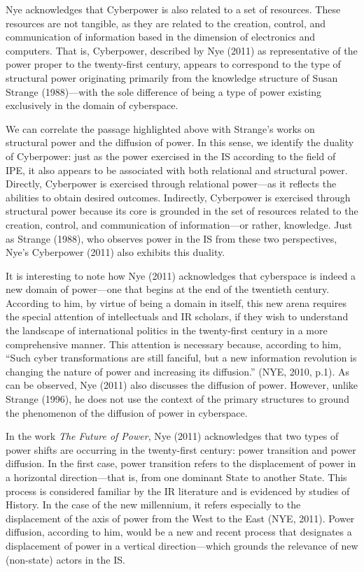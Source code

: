 Nye acknowledges that Cyberpower is also related to a set of resources. These resources are not tangible, as they are related to the creation, control, and communication of information based in the dimension of electronics and computers. That is, Cyberpower, described by Nye (2011) as representative of the power proper to the twenty-first century, appears to correspond to the type of structural power originating primarily from the knowledge structure of Susan Strange (1988)---with the sole difference of being a type of power existing exclusively in the domain of cyberspace.

We can correlate the passage highlighted above with Strange's works on structural power and the diffusion of power. In this sense, we identify the duality of Cyberpower: just as the power exercised in the IS according to the field of IPE, it also appears to be associated with both relational and structural power. Directly, Cyberpower is exercised through relational power---as it reflects the abilities to obtain desired outcomes. Indirectly, Cyberpower is exercised through structural power because its core is grounded in the set of resources related to the creation, control, and communication of information---or rather, knowledge. Just as Strange (1988), who observes power in the IS from these two perspectives, Nye's Cyberpower (2011) also exhibits this duality.

It is interesting to note how Nye (2011) acknowledges that cyberspace is indeed a new domain of power---one that begins at the end of the twentieth century. According to him, by virtue of being a domain in itself, this new arena requires the special attention of intellectuals and IR scholars, if they wish to understand the landscape of international politics in the twenty-first century in a more comprehensive manner. This attention is necessary because, according to him, ``Such cyber transformations are still fanciful, but a new information revolution is changing the nature of power and increasing its diffusion.'' (NYE, 2010, p.1). As can be observed, Nye (2011) also discusses the diffusion of power. However, unlike Strange (1996), he does not use the context of the primary structures to ground the phenomenon of the diffusion of power in cyberspace.

In the work \textit{The Future of Power}, Nye (2011) acknowledges that two types of power shifts are occurring in the twenty-first century: power transition and power diffusion. In the first case, power transition refers to the displacement of power in a horizontal direction---that is, from one dominant State to another State. This process is considered familiar by the IR literature and is evidenced by studies of History. In the case of the new millennium, it refers especially to the displacement of the axis of power from the West to the East (NYE, 2011). Power diffusion, according to him, would be a new and recent process that designates a displacement of power in a vertical direction---which grounds the relevance of new (non-state) actors in the IS.

